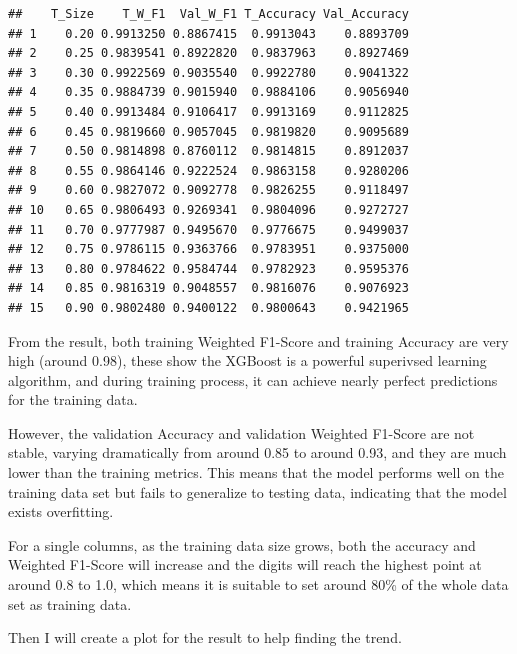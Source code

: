 \documentclass[
]{article}
\begin{document}
\begin{verbatim}
##    T_Size    T_W_F1  Val_W_F1 T_Accuracy Val_Accuracy
## 1    0.20 0.9913250 0.8867415  0.9913043    0.8893709
## 2    0.25 0.9839541 0.8922820  0.9837963    0.8927469
## 3    0.30 0.9922569 0.9035540  0.9922780    0.9041322
## 4    0.35 0.9884739 0.9015940  0.9884106    0.9056940
## 5    0.40 0.9913484 0.9106417  0.9913169    0.9112825
## 6    0.45 0.9819660 0.9057045  0.9819820    0.9095689
## 7    0.50 0.9814898 0.8760112  0.9814815    0.8912037
## 8    0.55 0.9864146 0.9222524  0.9863158    0.9280206
## 9    0.60 0.9827072 0.9092778  0.9826255    0.9118497
## 10   0.65 0.9806493 0.9269341  0.9804096    0.9272727
## 11   0.70 0.9777987 0.9495670  0.9776675    0.9499037
## 12   0.75 0.9786115 0.9363766  0.9783951    0.9375000
## 13   0.80 0.9784622 0.9584744  0.9782923    0.9595376
## 14   0.85 0.9816319 0.9048557  0.9816076    0.9076923
## 15   0.90 0.9802480 0.9400122  0.9800643    0.9421965
\end{verbatim}

From the result, both training Weighted F1-Score and training Accuracy
are very high (around 0.98), these show the XGBoost is a powerful
superivsed learning algorithm, and during training process, it can
achieve nearly perfect predictions for the training data.

However, the validation Accuracy and validation Weighted F1-Score are
not stable, varying dramatically from around 0.85 to around 0.93, and
they are much lower than the training metrics. This means that the model
performs well on the training data set but fails to generalize to
testing data, indicating that the model exists overfitting.

For a single columns, as the training data size grows, both the accuracy
and Weighted F1-Score will increase and the digits will reach the
highest point at around 0.8 to 1.0, which means it is suitable to set
around 80\% of the whole data set as training data.

Then I will create a plot for the result to help finding the trend.
\end{document}
